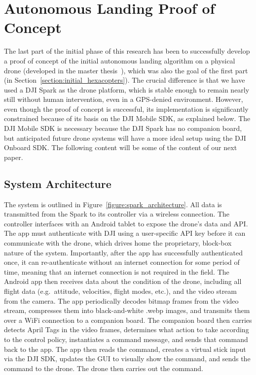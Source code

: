 \section{Autonomous Landing Proof of Concept}
\label{section:proof_of_concept}

The last part of the initial phase of this research has been to successfully develop a proof of concept
of the initial autonomous landing algorithm on a physical drone (developed in the master thesis~\cite{joshua_master_thesis}), which was also the goal of the first part (in Section~\ref{section:initial_hexacopters}).
The crucial difference is that we have used a DJI Spark as the drone platform,
which is stable enough to remain nearly still without human intervention,
even in a GPS-denied environment.
However, even though the proof of concept is successful,
its implementation is significantly constrained because of its basis on the DJI Mobile SDK,
as explained below.
The DJI Mobile SDK is necessary because the DJI Spark has no companion board,
but anticipated future drone systems will have a more ideal setup using the DJI Onboard SDK.
The following content will be some of the content of our next paper.

\subsection{System Architecture}

The system is outlined in Figure~\ref{figure:spark_architecture}.
All data is transmitted from the Spark to its controller via a wireless connection.
The controller interfaces with an Android tablet to expose the drone's data and API.
The app must authenticate with DJI using a user-specific API key
before it can communicate with the drone,
which drives home the proprietary, block-box nature of the system.
Importantly, after the app has successfully authenticated once, it can re-authenticate without
an internet connection for some period of time,
meaning that an internet connection is not required in the field.
The Android app then receives data about the condition of the drone,
including all flight data (e.g.~attitude, velocities, flight modes, etc.),
and the video stream from the camera.
The app periodically decodes bitmap frames from the video stream,
compresses them into black-and-white .webp images,
and transmits them over a WiFi connection to a companion board.
The companion board then carries detects April Tags in the video frames,
determines what action to take according to the control policy,
instantiates a command message,
and sends that command back to the app.
The app then reads the command,
creates a virtual stick input via the DJI SDK,
updates the GUI to visually show the command,
and sends the command to the drone.
The drone then carries out the command.

